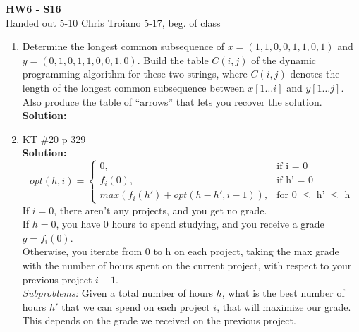 \documentclass[11pt]{article}
\begin{document}
\begin{center}
{\bf\large HW6 - S16}\\
Handed out 5-10 \hfill Chris Troiano \hfill 5-17, beg.
of class \\
\end{center}
\begin{enumerate}
\item
Determine the longest common subsequence of $x=(1,1,0,0,1,1,0,1)$ and
$y=(0,1,0,1,1,0,0,1,0)$. 
Build the table $C(i,j)$ of the dynamic programming algorithm for these
two strings, where $C(i,j)$ denotes the length of the longest common
subsequence between $x[1\ldots i]$ and $y[1\ldots j]$.
Also produce the table of ``arrows'' that lets you recover the solution.\\
\textbf{Solution:}\\
\vspace*{10cm}
 \item
KT \#20 p 329\\
\textbf{Solution:}\\
\begin{equation}
opt(h, i)=\begin{cases}
0, & \text{if i = 0}\\
f_i(0), & \text{if h' = 0}\\
max (f_i(h') + opt(h-h', i-1)), & \text{for 0 $\leq$ h' $\leq$ h}
\end{cases}
\end{equation}
If $i=0$, there aren't any projects, and you get no grade.\\
If $h=0$, you have 0 hours to spend studying, and you receive a grade $g = f_i(0)$.\\
Otherwise, you iterate from 0 to h on each project, taking the max grade with the number of hours spent on the current project, with respect to your previous project $i-1$.\\
\textit{Subproblems:} Given a total number of hours $h$, what is the best number of hours $h'$ that we can spend on each project $i$, that will maximize our grade. This depends on the grade we received on the previous project.
\vspace*{3cm}


\end{enumerate}
\end{document}
